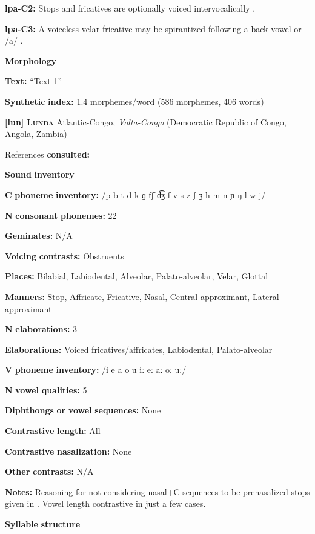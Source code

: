 \textbf{lpa-C2:} Stops and fricatives are optionally voiced intervocalically \citep[17]{Lacrampe2014}.

\textbf{lpa-C3:} A voiceless velar fricative may be spirantized following a back vowel or /a/ \citep[20]{Lacrampe2014}.

\textbf{Morphology}

\textbf{Text:} “Text 1” \citep[495-500]{Lacrampe2014}

\textbf{Synthetic} \textbf{index:} 1.4 morphemes/word (586 morphemes, 406 words)

\textbf{[lun]}   \textbf{\textsc{Lunda}  }  Atlantic-Congo, \textit{Volta-Congo} (Democratic Republic of Congo, Angola, Zambia)

References \textbf{consulted:} \citet{Kawasha2003}

\textbf{Sound} \textbf{inventory}

\textbf{C} \textbf{phoneme} \textbf{inventory:} /p b t d k ɡ t͡ʃ d͡ʒ f v s z ʃ ʒ h m n ɲ ŋ l w j/

\textbf{N} \textbf{consonant} \textbf{phonemes:} 22

\textbf{Geminates:} N/A

\textbf{Voicing} \textbf{contrasts:} Obstruents

\textbf{Places:} Bilabial, Labiodental, Alveolar, Palato-alveolar, Velar, Glottal

\textbf{Manners:} Stop, Affricate, Fricative, Nasal, Central approximant, Lateral approximant

\textbf{N} \textbf{elaborations:} 3

\textbf{Elaborations:} Voiced fricatives/affricates, Labiodental, Palato-alveolar

\textbf{V} \textbf{phoneme} \textbf{inventory:} /i e a o u iː eː aː oː uː/

\textbf{N} \textbf{vowel} \textbf{qualities:} 5

\textbf{Diphthongs} \textbf{or} \textbf{vowel} \textbf{sequences:} None

\textbf{Contrastive} \textbf{length:} All

\textbf{Contrastive} \textbf{nasalization:} None

\textbf{Other} \textbf{contrasts:} N/A

\textbf{Notes:} Reasoning for not considering nasal+C sequences to be prenasalized stops given in \citet[24]{Kawasha2003}. Vowel length contrastive in just a few cases.

\textbf{Syllable} \textbf{structure}

